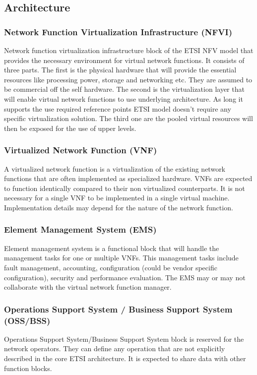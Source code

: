 \documentclass[12pt,oneandhalf,chaparabic,ceng,ms,eng,oneside,pntc]{gsufbe}
\begin{document}
\subsection{Architecture}
\subsubsection{Network Function Virtualization Infrastructure (NFVI)}
Network function virtualization infrastructure block of the ETSI NFV model that provides the necessary
environment for virtual network functions. It consists of three parts. The first is the physical hardware
that will provide the essential resources like processing power, storage and networking etc. They are
assumed to be commercial off the self hardware. The second is the virtualization layer that will enable
virtual network functions to use underlying architecture. As long it supports the use required reference
points ETSI model doesn't require any specific virtualization solution. The third one
are the pooled virtual resources will then be exposed for the use of upper levels.

\subsubsection{Virtualized Network Function (VNF)}
A virtualized network function is a virtualization of the existing network functions that are often
implemented as specialized hardware. VNFs are expected to function identically compared to their non 
virtualized counterparts. It is not necessary for a single VNF to be implemented in a single virtual
machine. Implementation details may depend for the nature of the network function.

\subsubsection{Element Management System (EMS)}
Element management system is a functional block that will handle the management tasks for one or
multiple VNFs. This management tasks include fault management, accounting, configuration (could be 
vendor specific configuration), security and performance evaluation. The EMS may or may not collaborate
with the virtual network function manager.

\subsubsection{Operations Support System / Business Support System (OSS/BSS)}
Operations Support System/Business Support System block is reserved for the network
operators. They can define any operation that are not explicitly described in the core
ETSI architecture. It is expected to share data with other function blocks.
\end{document}
